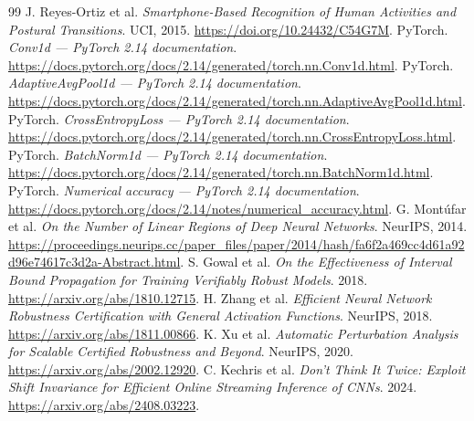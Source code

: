 \documentclass[11pt,a4paper]{article}
\theoremstyle{definition}
\begin{document}
\begin{thebibliography}{99}
 J. Reyes-Ortiz et al. \emph{Smartphone-Based Recognition of
Human Activities and Postural Transitions}. UCI, 2015.
\url{https://doi.org/10.24432/C54G7M}.
 PyTorch. \emph{Conv1d --- PyTorch 2.14 documentation}.
\url{https://docs.pytorch.org/docs/2.14/generated/torch.nn.Conv1d.html}.
 PyTorch. \emph{AdaptiveAvgPool1d --- PyTorch 2.14
documentation}.
\url{https://docs.pytorch.org/docs/2.14/generated/torch.nn.AdaptiveAvgPool1d.html}.
 PyTorch. \emph{CrossEntropyLoss --- PyTorch 2.14
documentation}.
\url{https://docs.pytorch.org/docs/2.14/generated/torch.nn.CrossEntropyLoss.html}.
 PyTorch. \emph{BatchNorm1d --- PyTorch 2.14 documentation}.
\url{https://docs.pytorch.org/docs/2.14/generated/torch.nn.BatchNorm1d.html}.
 PyTorch. \emph{Numerical accuracy --- PyTorch 2.14
documentation}.
\url{https://docs.pytorch.org/docs/2.14/notes/numerical_accuracy.html}.
 G. Mont\'ufar et al. \emph{On the Number of Linear
Regions of Deep Neural Networks}. NeurIPS, 2014.
\url{https://proceedings.neurips.cc/paper_files/paper/2014/hash/fa6f2a469cc4d61a92d96e74617c3d2a-Abstract.html}.
 S. Gowal et al. \emph{On the Effectiveness of Interval Bound
Propagation for Training Verifiably Robust Models}. 2018.
\url{https://arxiv.org/abs/1810.12715}.
 H. Zhang et al. \emph{Efficient Neural Network Robustness
Certification with General Activation Functions}. NeurIPS, 2018.
\url{https://arxiv.org/abs/1811.00866}.
 K. Xu et al. \emph{Automatic Perturbation Analysis for
Scalable Certified Robustness and Beyond}. NeurIPS, 2020.
\url{https://arxiv.org/abs/2002.12920}.
 C. Kechris et al. \emph{Don't Think It Twice: Exploit
Shift Invariance for Efficient Online Streaming Inference of CNNs}. 2024.
\url{https://arxiv.org/abs/2408.03223}.
\end{thebibliography}
\end{document}
